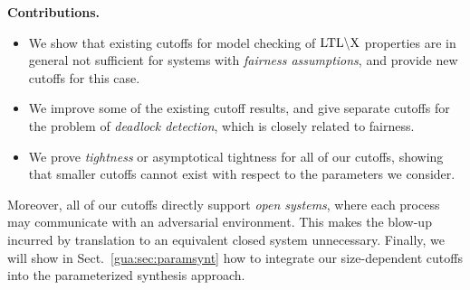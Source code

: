 \smallskip
\noindent
{\bf Contributions.}
\begin{itemize}
\item We show that existing cutoffs for model checking of $\text{LTL}\backslash\text{X}$ properties are in general not sufficient for systems with \emph{fairness assumptions}, and provide new cutoffs for this case.
\item We improve some of the existing cutoff results, and give separate cutoffs for the problem of \emph{deadlock detection}, which is closely related to fairness. 
\item We prove \emph{tightness} or asymptotical tightness for all of our cutoffs, showing that smaller cutoffs cannot exist with respect to the parameters we consider.
\end{itemize}
%
Moreover, all of our cutoffs directly support \emph{open systems}, where each process may communicate with an adversarial environment. This makes the blow-up incurred by translation to an equivalent closed system unnecessary. 
Finally,
we will show in Sect.~\ref{gua:sec:paramsynt}
how to integrate our size-dependent cutoffs into the parameterized synthesis approach.
